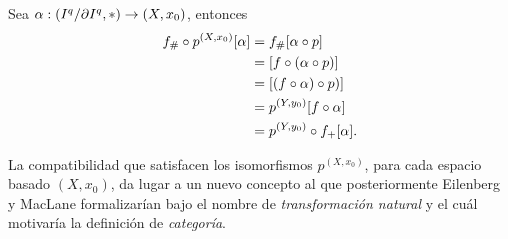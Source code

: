 \begin{dem}
    Sea $\alpha:(I^q/\partial I^{q},*)\to(X,x_0)$, entonces
    \begin{align*}
        f_\#\circ p^{(X,x_0)}[\alpha]&=f_\#[\alpha\circ p]\\
        &=[f\circ(\alpha\circ p)]\\
        &=[(f\circ\alpha)\circ p)]\\
        &=p^{(Y,y_0)}[f\circ \alpha]\\
        &=p^{(Y,y_0)}\circ f_+[\alpha].
    \end{align*}
\end{dem}
La compatibilidad que satisfacen los isomorfismos $p^{(X,x_0)}$, para cada espacio basado $(X,x_0)$, da lugar a un nuevo concepto al que posteriormente Eilenberg y MacLane formalizarían bajo el nombre de \textit{transformación natural} y el cuál motivaría la definición de \textit{categoría}.